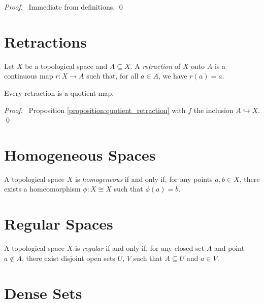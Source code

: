 \begin{proof}
    \pf\ Immediate from definitions. \qed
\end{proof}

\section{Retractions}

\begin{definition}[Retraction]
    Let $X$ be a topological space and $A \subseteq X$. A \emph{retraction} of $X$ onto $A$ is a continuous map $r : X \rightarrow A$ such that, for all $a \in A$,
    we have $r(a) = a$.    
\end{definition}

\begin{proposition}
    Every retraction is a quotient map.
\end{proposition}

\begin{proof}
    \pf\ Proposition \ref{proposition:quotient_retraction} with $f$ the inclusion $A \hookrightarrow X$. \qed
\end{proof}

\section{Homogeneous Spaces}

\begin{definition}[Homogeneous]
    A topological space $X$ is \emph{homogeneous} if and only if, for any
    points $a, b \in X$, there exists a homeomorphism $\phi : X \cong X$
    such that $\phi(a) = b$.
\end{definition}

\section{Regular Spaces}

\begin{definition}
    A topological space $X$ is \emph{regular} if and only if, for any closed set $A$ and point $a \notin A$, there exist disjoint open sets $U$, $V$ such that
    $A \subseteq U$ and $a \in V$.    
\end{definition}

\section{Dense Sets}

